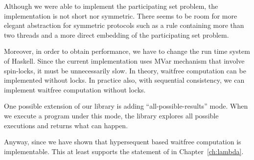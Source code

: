 Although we were able to implement the participating set problem,
the implementation is not short nor symmetric.
There seems to be room for more elegant abstraction for symmetric
protocols such as
a rule containing more than two threads and a more direct embedding of the
participating set problem.

Moreover, in order to obtain performance, we have to change the run time
system of Haskell.  Since the current implementation uses MVar mechanism
that involve spin-locks, it must be unnecessarily slow.  In theory, waitfree
computation can be implemented without locks.  In practice also, with
sequential consistency, we can implement waitfree computation without
locks.

One possible extension of our library is adding ``all-possible-results''
mode.  When we execute a program under this mode, the library explores
all possible executions and returns what can happen.

Anyway, since we have shown that hypersequent based waitfree computation
is implementable.  This at least supports the statement of
 in Chapter~\ref{ch:lambda}.
